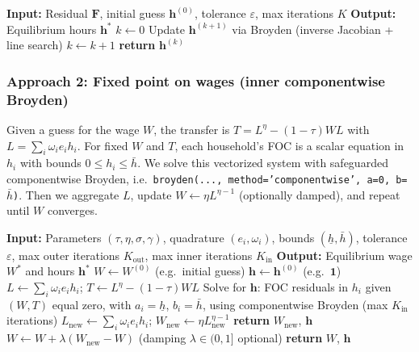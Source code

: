 \begin{algorithm}[H]
\caption{Full-system Broyden for labor supply equilibrium}
\label{alg:broyden-full}
\begin{algorithmic}[1]
\State \textbf{Input:} Residual $\mathbf{F}$, initial guess $\mathbf{h}^{(0)}$, tolerance $\varepsilon$, max iterations $K$
\State \textbf{Output:} Equilibrium hours $\mathbf{h}^*$
\State $k \gets 0$
  \State Update $\mathbf{h}^{(k+1)}$ via Broyden (inverse Jacobian + line search)
  \State $k \gets k + 1$
\EndWhile
\State \textbf{return} $\mathbf{h}^{(k)}$
\end{algorithmic}
\end{algorithm}

\subsubsection{Approach 2: Fixed point on wages (inner componentwise Broyden)}

Given a guess for the wage $W$, the transfer is $T = L^\eta - (1-\tau) W L$ with $L = \sum_i \omega_i e_i h_i$. For fixed $W$ and $T$, each household's FOC is a scalar equation in $h_i$ with bounds $0 \le h_i \le \bar{h}$. We solve this vectorized system with safeguarded componentwise Broyden, i.e.\ \texttt{broyden(..., method='componentwise', a=0, b=}$\bar{h}$\texttt{)}. Then we aggregate $L$, update $W \leftarrow \eta L^{\eta-1}$ (optionally damped), and repeat until $W$ converges.

\begin{algorithm}[H]
\caption{Wage fixed-point with inner componentwise Broyden}
\label{alg:wage-fp}
\begin{algorithmic}[1]
\State \textbf{Input:} Parameters $(\tau,\eta,\sigma,\gamma)$, quadrature $(e_i,\omega_i)$, bounds $(\underline{h},\bar{h})$, tolerance $\varepsilon$, max outer iterations $K_{\mathrm{out}}$, max inner iterations $K_{\mathrm{in}}$
\State \textbf{Output:} Equilibrium wage $W^*$ and hours $\mathbf{h}^*$
\State $W \gets W^{(0)}$ (e.g.\ initial guess)
\State $\mathbf{h} \gets \mathbf{h}^{(0)}$ (e.g.\ $\mathbf{1}$)
  \State $L \gets \sum_i \omega_i e_i h_i$; \; $T \gets L^\eta - (1-\tau) W L$
  \State Solve for $\mathbf{h}$: FOC residuals in $h_i$ given $(W,T)$ equal zero, with $a_i = \underline{h}$, $b_i = \bar{h}$, using componentwise Broyden (max $K_{\mathrm{in}}$ iterations)
  \State $L_{\mathrm{new}} \gets \sum_i \omega_i e_i h_i$; \; $W_{\mathrm{new}} \gets \eta L_{\mathrm{new}}^{\eta-1}$
    \State \textbf{return} $W_{\mathrm{new}}$, $\mathbf{h}$
  \EndIf
  \State $W \gets W + \lambda (W_{\mathrm{new}} - W)$ (damping $\lambda \in (0,1]$ optional)
\EndFor
\State \textbf{return} $W$, $\mathbf{h}$
\end{algorithmic}
\end{algorithm}

